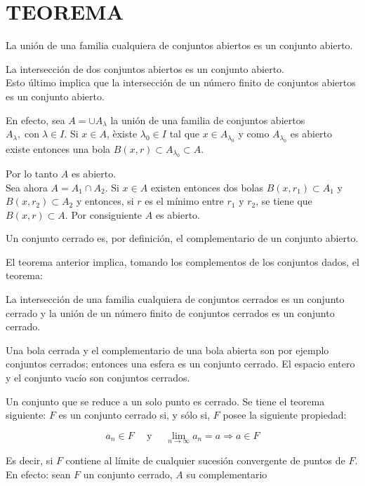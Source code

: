 \documentclass[10pt]{article}
\theoremstyle{plain}
\theoremstyle{definition}
\theoremstyle{remark}
\begin{document}
\section*{TEOREMA}
La unión de una familia cualquiera de conjuntos abiertos es un conjunto abierto.

La intersección de dos conjuntos abiertos es un conjunto abierto.\\
Esto último implica que la intersección de un número finito de conjuntos abiertos es un conjunto abierto.

En efecto, sea $A=\cup A_{\lambda}$ la unión de una familia de conjuntos abiertos $A_{\lambda}, \operatorname{con} \lambda \in I$. Si $x \in A$, èxiste $\lambda_{0} \in I$ tal que $x \in A_{\lambda_{0}}$ y como $A_{\lambda_{0}}$ es abierto existe entonces una bola $B(x, r) \subset A_{\lambda_{0}} \subset A$.

Por lo tanto $A$ es abierto.\\
Sea ahora $A=A_{1} \cap A_{2}$. Si $x \in A$ existen entonces dos bolas $B\left(x, r_{1}\right) \subset A_{1}$ y $B\left(x, r_{2}\right) \subset A_{2}$ y entonces, si $r$ es el mínimo entre $r_{1}$ y $r_{2}$, se tiene que $B(x, r) \subset A$. Por consiguiente $A$ es abierto.

Un conjunto cerrado es, por definición, el complementario de un conjunto abierto.

El teorema anterior implica, tomando los complementos de los conjuntos dados, el teorema:

La intersección de una familia cualquiera de conjuntos cerrados es un conjunto cerrado y la unión de un número finito de conjuntos cerrados es un conjunto cerrado.

Una bola cerrada y el complementario de una bola abierta son por ejemplo conjuntos cerrados; entonces una esfera es un conjunto cerrado. El espacio entero y el conjunto vacío son conjuntos cerrados.

Un conjunto que se reduce a un solo punto es cerrado. Se tiene el teorema siguiente: $F$ es un conjunto cerrado si, y sólo si, $F$ posee la siguiente propiedad:


\begin{equation*}
a_{n} \in F \quad \text { y } \quad \lim _{n \rightarrow \infty} a_{n}=a \Rightarrow a \in F \tag{1-5}
\end{equation*}


Es decir, si $F$ contiene al límite de cualquier sucesión convergente de puntos de $F$. En efecto: sean $F$ un conjunto cerrado, $A$ su complementario
\end{document}
